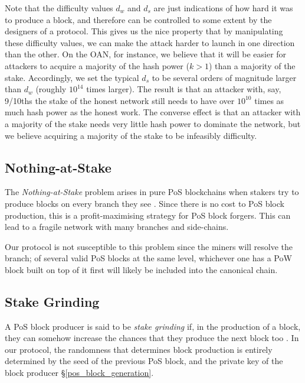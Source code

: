 Note that the difficulty values $d_w$ and $d_s$ are just indications
of how hard it was to produce a block, and therefore can be controlled to some
extent by the designers of a protocol. This gives us
the nice property that by manipulating these difficulty values, 
we can make the attack harder to launch in one direction than the other. On the OAN,
for instance, we believe that it will be easier for attackers to acquire a majority of the
hash power ($k > 1$) than a majority of the stake. Accordingly, we set the typical
$d_s$ to be several orders of magnitude larger than $d_w$ (roughly $10^{14}$ times
larger). The result is that an attacker with, say, 9/10ths the stake of the
honest network still needs to have over $10^{10}$ times as much hash power as the honest
work. The converse effect is that an attacker with a majority of the stake needs
very little hash power to dominate the network, but we believe acquiring a majority
of the stake to be infeasibly difficulty.

\subsection{Nothing-at-Stake}

The  \textit{Nothing-at-Stake} problem arises in pure PoS blockchains when stakers
try to produce blocks on every branch they see \cite{brown2018formal}. Since there
is no cost to PoS block production, this is a profit-maximising strategy for PoS block
forgers. This can lead to a fragile network with many branches and side-chains. 

Our protocol is not susceptible to this problem since the miners will resolve the 
branch; of several valid PoS blocks at the same level, whichever one has a PoW block
built on top of it first will likely be included into the canonical chain.

\subsection{Stake Grinding}

A PoS block producer is said to be \textit{stake grinding} if, in the production of
a block, they can somehow increase the chances that they produce the next block too
\cite{buterin_randomness}. In our protocol, the randomness that determines block production is entirely
determined by the seed of the previous PoS block, and the private key of the block producer
\S\ref{pos_block_generation}.

